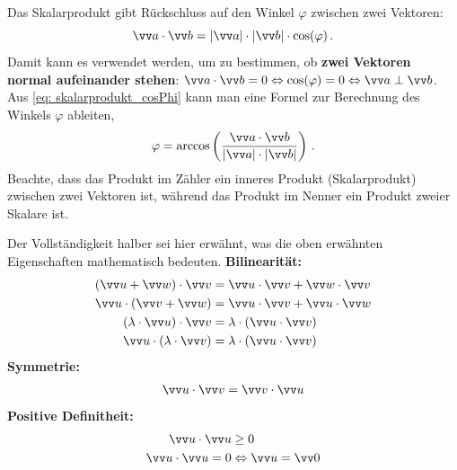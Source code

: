 Das Skalarprodukt gibt Rückschluss auf den Winkel $\varphi$ zwischen zwei Vektoren:
\begin{equation}\label{eq: skalarprodukt_cosPhi}
    \ivec{a} \cdot \ivec{b} = |\ivec{a}| \cdot |\ivec{b}| \cdot \cos(\varphi) \mDot
\end{equation}
Damit kann es verwendet werden, um zu bestimmen, ob \textbf{zwei Vektoren normal aufeinander stehen}: $\ivec{a} \cdot \ivec{b} = 0 \Leftrightarrow \cos(\varphi)=0 \Leftrightarrow \ivec{a} \perp \ivec{b}$. Aus \cref{eq: skalarprodukt_cosPhi} kann man eine Formel zur Berechnung des Winkels $\varphi$ ableiten,
\begin{equation}
    \varphi = \arccos\left( \frac{\ivec{a} \cdot \ivec{b}}{|\ivec{a}| \cdot |\ivec{b}|}\right)\mDot
\end{equation}
Beachte, dass das Produkt im Zähler ein inneres Produkt (Skalarprodukt) zwischen zwei Vektoren ist, während das Produkt im Nenner ein Produkt zweier Skalare ist. 

Der Vollständigkeit halber sei hier erwähnt, was die oben erwähnten Eigenschaften mathematisch bedeuten.\newline
\textbf{Bilinearität:}
\begin{align*}
    (\ivec{u} + \ivec{w}) \cdot \ivec{v} &= \ivec{u} \cdot \ivec{v} + \ivec{w} \cdot \ivec{v} \\
    \ivec{u} \cdot (\ivec{v} + \ivec{w}) &= \ivec{u} \cdot \ivec{v} + \ivec{u} \cdot \ivec{w} \\
    (\lambda \cdot \ivec{u}) \cdot \ivec{v} &= \lambda \cdot (\ivec{u} \cdot \ivec{v}) \\
    \ivec{u} \cdot (\lambda \cdot \ivec{v}) &= \lambda \cdot (\ivec{u} \cdot \ivec{v})
\end{align*}
\textbf{Symmetrie:}
\begin{align*}
    \ivec{u} \cdot \ivec{v} = \ivec{v} \cdot \ivec{u}
\end{align*}
\textbf{Positive Definitheit:}
\begin{align*}
    \ivec{u} \cdot \ivec{u} &\ge 0 \\
    \ivec{u} \cdot \ivec{u} = 0 &\Leftrightarrow \ivec{u} = \ivec{0}
\end{align*}

